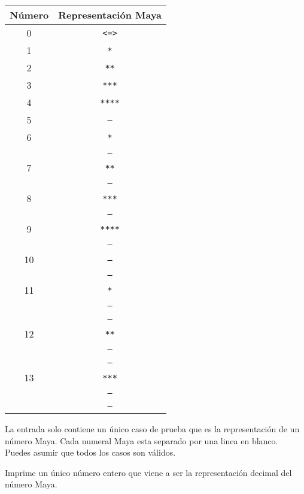\begin{tabular}{|c|c|}
\hline
\textbf{Número} & \textbf{Representación Maya} \\
\hline
0 & \texttt{<=>} \\
\hline
1 & \texttt{*} \\
\hline
2 & \texttt{**} \\
\hline
3 & \texttt{***} \\
\hline
4 & \texttt{****} \\
\hline
5 & \texttt{---} \\
\hline
6 & \texttt{*} \\
  & \texttt{---} \\
\hline
7 & \texttt{**} \\
  & \texttt{---} \\
\hline
8 & \texttt{***} \\
  & \texttt{---} \\
\hline
9 & \texttt{****} \\
  & \texttt{---} \\
\hline
10 & \texttt{---} \\
   & \texttt{---} \\
\hline
11 & \texttt{*} \\
   & \texttt{---} \\
   & \texttt{---} \\
\hline
12 & \texttt{**} \\
   & \texttt{---} \\
   & \texttt{---} \\
\hline
13 & \texttt{***} \\
   & \texttt{---} \\
   & \texttt{---} \\
\hline
\end{tabular}


La entrada solo contiene un \'unico caso de prueba que es la representaci\'on de un n\'umero Maya. Cada numeral Maya esta separado por una linea en blanco. Puedes asumir que todos los casos son v\'alidos.

\outputText

Imprime un único número entero que viene a ser la representaci\'on decimal del n\'umero Maya.

\exampleCases

\begin{example}
\end{example}

